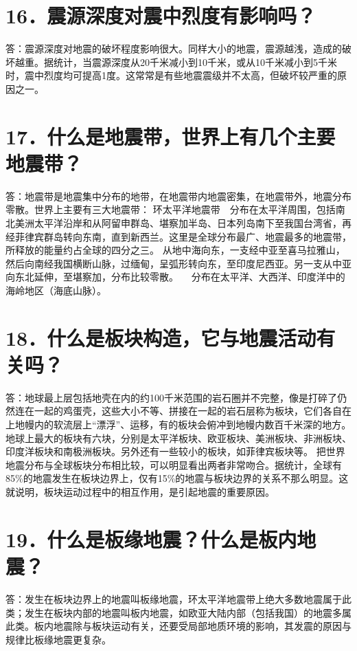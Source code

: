 \documentclass[a4paper,10pt,english]{sphinxmanual}
\begin{document}
\section{16．震源深度对震中烈度有影响吗？}
\label{\detokenize{index:id18}}
答：震源深度对地震的破坏程度影响很大。同样大小的地震，震源越浅，造成的破坏越重。据统计，当震源深度从20千米减小到10千米，或从10千米减小到5千米时，震中烈度均可提高1度。这常常是有些地震震级并不太高，但破坏较严重的原因之一。


\section{17．什么是地震带，世界上有几个主要地震带？}
\label{\detokenize{index:id19}}
答：地震带是地震集中分布的地带，在地震带内地震密集，在地震带外，地震分布零散。世界上主要有三大地震带：
环太平洋地震带　分布在太平洋周围，包括南北美洲太平洋沿岸和从阿留申群岛、堪察加半岛、日本列岛南下至我国台湾省，再经菲律宾群岛转向东南，直到新西兰。这里是全球分布最广、地震最多的地震带，所释放的能量约占全球的四分之三。
   从地中海向东，一支经中亚至喜马拉雅山，然后向南经我国横断山脉，过缅甸，呈弧形转向东，至印度尼西亚。另一支从中亚向东北延伸，至堪察加，分布比较零散。
　分布在太平洋、大西洋、印度洋中的海岭地区（海底山脉）。


\section{18．什么是板块构造，它与地震活动有关吗？}
\label{\detokenize{index:id20}}
答：地球最上层包括地壳在内的约100千米范围的岩石圈并不完整，像是打碎了仍然连在一起的鸡蛋壳，这些大小不等、拼接在一起的岩石层称为板块，它们各自在上地幔内的软流层上“漂浮”、运移，有的板块会俯冲到地幔内数百千米深的地方。
地球上最大的板块有六块，分别是太平洋板块、欧亚板块、美洲板块、非洲板块、印度洋板块和南极洲板块。另外还有一些较小的板块，如菲律宾板块等。
把世界地震分布与全球板块分布相比较，可以明显看出两者非常吻合。据统计，全球有85\%的地震发生在板块边界上，仅有15\%的地震与板块边界的关系不那么明显。这就说明，板块运动过程中的相互作用，是引起地震的重要原因。


\section{19．什么是板缘地震？什么是板内地震？}
\label{\detokenize{index:id21}}
答：发生在板块边界上的地震叫板缘地震，环太平洋地震带上绝大多数地震属于此类；发生在板块内部的地震叫板内地震，如欧亚大陆内部（包括我国）的地震多属此类。板内地震除与板块运动有关，还要受局部地质环境的影响，其发震的原因与规律比板缘地震更复杂。
\end{document}

